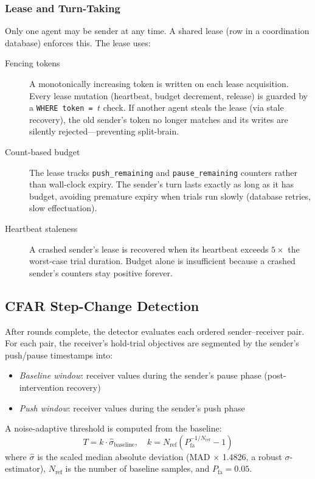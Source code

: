 \subsubsection{Lease and Turn-Taking}

Only one agent may be sender at any time. A shared lease
(row in a coordination database) enforces this. The lease uses:

\begin{description}
  \item[Fencing tokens] A monotonically increasing token is written
    on each lease acquisition. Every lease mutation (heartbeat,
    budget decrement, release) is guarded by a \texttt{WHERE token =
    $t$} check. If another agent steals the lease (via stale
    recovery), the old sender's token no longer matches and its
    writes are silently rejected---preventing split-brain.
  \item[Count-based budget] The lease tracks
    \texttt{push\_remaining} and \texttt{pause\_remaining} counters
    rather than wall-clock expiry. The sender's turn lasts exactly
    as long as it has budget, avoiding premature expiry when trials
    run slowly (database retries, slow effectuation).
  \item[Heartbeat staleness] A crashed sender's lease is recovered
    when its heartbeat exceeds $5 \times$ the worst-case trial
    duration. Budget alone is insufficient because a crashed sender's
    counters stay positive forever.
\end{description}



\subsection{CFAR Step-Change Detection}

After rounds complete, the detector evaluates each ordered
sender--receiver pair. For each pair, the receiver's hold-trial
objectives are segmented by the sender's push/pause timestamps into:

\begin{itemize}
  \item \emph{Baseline window}: receiver values during the sender's
    pause phase (post-intervention recovery)
  \item \emph{Push window}: receiver values during the sender's push
    phase
\end{itemize}

A noise-adaptive threshold is computed from the baseline:
\begin{equation}
  T = k \cdot \widehat{\sigma}_{\text{baseline}}, \quad
  k = N_{\text{ref}} \left( P_{\text{fa}}^{-1/N_{\text{ref}}} - 1 \right)
  \label{eq:threshold}
\end{equation}
where $\widehat{\sigma}$ is the scaled median absolute deviation
(MAD $\times$ 1.4826, a robust $\sigma$-estimator), $N_{\text{ref}}$
is the number of baseline samples, and $P_{\text{fa}} = 0.05$.

